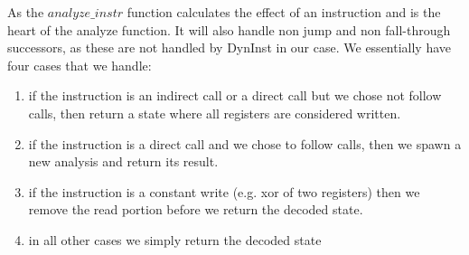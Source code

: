 
As the $analyze\_instr$ function calculates the effect of an instruction and is the heart of the analyze function. It will also handle non jump 
and non fall-through successors, as these are not handled by DynInst in our case. We essentially have four cases that we handle:
\begin{enumerate}
\item if the instruction is an indirect call or a direct call but we chose not follow calls, then return a state where all registers are considered written.
\item if the instruction is a direct call and we chose to follow calls, then we spawn a new analysis and return its result.
\item if the instruction is a constant write (e.g. xor of two registers) then we remove the read portion before we return the decoded state.
\item in all other cases we simply return the decoded state
\end{enumerate}

